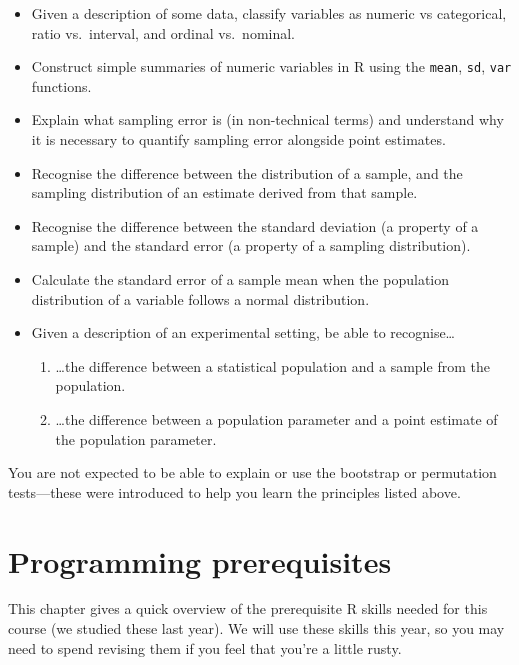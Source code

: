 \documentclass[]{book}
\providecommand{\tightlist}{%
  \setlength{\itemsep}{0pt}\setlength{\parskip}{0pt}}
\begin{document}
\begin{itemize}
\item
  Given a description of some data, classify variables as numeric vs
  categorical, ratio vs.~interval, and ordinal vs.~nominal.
\item
  Construct simple summaries of numeric variables in R using the
  \texttt{mean}, \texttt{sd}, \texttt{var} functions.
\item
  Explain what sampling error is (in non-technical terms) and understand
  why it is necessary to quantify sampling error alongside point
  estimates.
\item
  Recognise the difference between the distribution of a sample, and the
  sampling distribution of an estimate derived from that sample.
\item
  Recognise the difference between the standard deviation (a property of
  a sample) and the standard error (a property of a sampling
  distribution).
\item
  Calculate the standard error of a sample mean when the population
  distribution of a variable follows a normal distribution.
\item
  Given a description of an experimental setting, be able to
  recognise\ldots{}

  \begin{enumerate}
  \def\labelenumi{\arabic{enumi}.}
  \tightlist
  \item
    \ldots{}the difference between a statistical population and a sample
    from the population.
  \item
    \ldots{}the difference between a population parameter and a point
    estimate of the population parameter.
  \end{enumerate}
\end{itemize}

You are not expected to be able to explain or use the bootstrap or
permutation tests---these were introduced to help you learn the
principles listed above.

\hypertarget{programming-prerequisites}{\chapter{Programming
prerequisites}\label{programming-prerequisites}}

This chapter gives a quick overview of the prerequisite R skills needed
for this course (we studied these last year). We will use these skills
this year, so you may need to spend revising them if you feel that
you're a little rusty.
\end{document}
